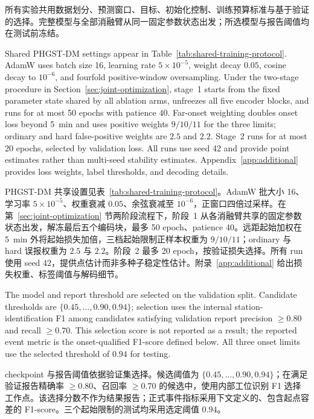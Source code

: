 \documentclass[a4paper,fleqn]{cas-dc}
\newcommand{\zhpara}[1]{%
  \par\begingroup\small\color{black!72}\noindent #1\par\endgroup}
\begin{document}
\zhpara{所有实验共用数据划分、预测窗口、目标、初始化控制、训练预算标准与基于验证的选择。完整模型与全部消融臂从同一固定参数状态出发；所选模型与报告阈值均在测试前冻结。}



Shared PHGST-DM settings appear in Table~\ref{tab:shared-training-protocol}. AdamW uses batch size 16, learning rate $5\times10^{-5}$, weight decay $0.05$, cosine decay to $10^{-6}$, and fourfold positive-window oversampling. Under the two-stage procedure in Section~\ref{sec:joint-optimization}, stage~1 starts from the fixed parameter state shared by all ablation arms, unfreezes all five encoder blocks, and runs for at most 50 epochs with patience 40. Far-onset weighting doubles onset loss beyond 5~min and uses positive weights $9/10/11$ for the three limits; ordinary and hard false-positive weights are $2.5$ and $2.2$. Stage~2 runs for at most 20 epochs, selected by validation loss. All runs use seed 42 and provide point estimates rather than multi-seed stability estimates. Appendix~\ref{app:additional} provides loss weights, label thresholds, and decoding details.

\zhpara{PHGST-DM 共享设置见表~\ref{tab:shared-training-protocol}。AdamW 批大小 16、学习率 $5\times10^{-5}$、权重衰减 $0.05$、余弦衰减至 $10^{-6}$，正窗口四倍过采样。在第~\ref{sec:joint-optimization} 节两阶段流程下，阶段~1 从各消融臂共享的固定参数状态出发，解冻最后五个编码块，最多 50 epoch、patience 40。远距起始加权在 5~min 外将起始损失加倍，三档起始限制正样本权重为 $9/10/11$；ordinary 与 hard 误报权重为 $2.5$ 与 $2.2$。阶段~2 最多 20 epoch，按验证损失选择。所有 run 使用 seed 42，提供点估计而非多种子稳定性估计。附录~\ref{app:additional} 给出损失权重、标签阈值与解码细节。}


The model and report threshold are selected on the validation split. Candidate thresholds are $\{0.45,\dots,0.90,0.94\}$; selection uses the internal station-identification F1 among candidates satisfying validation report precision $\geq0.80$ and recall $\geq0.70$. This selection score is not reported as a result; the reported event metric is the onset-qualified F1-score defined below. All three onset limits use the selected threshold of $0.94$ for testing.

\zhpara{checkpoint 与报告阈值依据验证集选择。候选阈值为 $\{0.45,\dots,0.90,0.94\}$；在满足验证报告精确率 $\geq0.80$、召回率 $\geq0.70$ 的候选中，使用内部工位识别 F1 选择工作点。该选择分数不作为结果报告；正式事件指标采用下文定义的、包含起点容差的 F1-score。三个起始限制的测试均采用选定阈值 $0.94$。}
\end{document}
